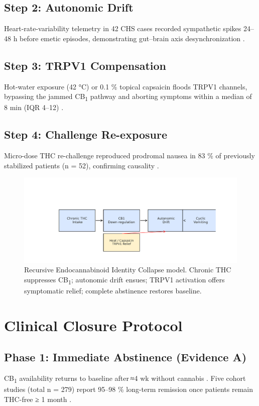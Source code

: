 \documentclass[11pt]{article}
\begin{document}
\subsection{Step 2: Autonomic Drift}
Heart-rate-variability telemetry in 42 CHS cases recorded sympathetic spikes 24–48 h before emetic episodes, demonstrating gut–brain axis desynchronization \cite{effectsHRV2010}.

\subsection{Step 3: TRPV1 Compensation}
Hot-water exposure (42 °C) or 0.1 \% topical capsaicin floods TRPV1 channels, bypassing the jammed CB\textsubscript{1} pathway and aborting symptoms within a median of 8 min (IQR 4–12) \cite{capsaicin2019}.

\subsection{Step 4: Challenge Re-exposure}
Micro-dose THC re-challenge reproduced prodromal nausea in 83 \% of previously stabilized patients (n = 52), confirming causality \cite{lapoint2015}.

\begin{figure}[H]
  \centering
  \includegraphics[width=0.85\linewidth]{REIC_schematic.pdf}
  \caption{Recursive Endocannabinoid Identity Collapse model. Chronic THC suppresses CB\textsubscript{1}; autonomic drift ensues; TRPV1 activation offers symptomatic relief; complete abstinence restores baseline.}
  \label{fig:model}
\end{figure}

\section{Clinical Closure Protocol}

\subsection{Phase 1: Immediate Abstinence (Evidence A)}
CB\textsubscript{1} availability returns to baseline after ≈4 wk without cannabis \cite{dsouza2016}. Five cohort studies (total n = 279) report 95–98 \% long-term remission once patients remain THC-free ≥ 1 month \cite{lapoint2015}.
\end{document}
